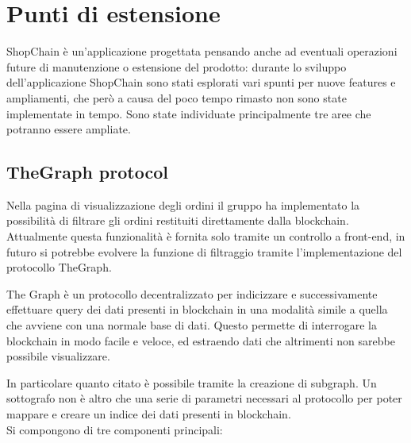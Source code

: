 \section{Punti di estensione} \label{section:punti_estensione}

ShopChain è un'applicazione progettata pensando anche ad eventuali operazioni future di manutenzione o
estensione del prodotto: durante lo sviluppo dell'applicazione ShopChain sono stati esplorati vari spunti per nuove features e ampliamenti, 
che però a causa del poco tempo rimasto non sono state implementate in tempo.
Sono state individuate principalmente tre aree che potranno essere ampliate.

\subsection{TheGraph protocol}

Nella pagina di visualizzazione degli ordini il gruppo ha implementato la possibilità di filtrare gli ordini restituiti direttamente dalla blockchain. Attualmente questa funzionalità è fornita solo tramite un controllo a front-end, in futuro si potrebbe evolvere la funzione di filtraggio tramite l'implementazione del protocollo TheGraph\glo.

The Graph è un protocollo decentralizzato per indicizzare e successivamente effettuare query dei dati presenti in blockchain in una modalità simile a quella che avviene con una normale base di dati. Questo permette di interrogare la blockchain in modo facile e veloce, ed estraendo dati che altrimenti non sarebbe possibile visualizzare.

In particolare quanto citato è possibile tramite la creazione di subgraph. Un sottografo non è altro che una serie di parametri necessari al protocollo per poter mappare e creare un indice dei dati presenti in blockchain.\\
Si compongono di tre componenti principali:

